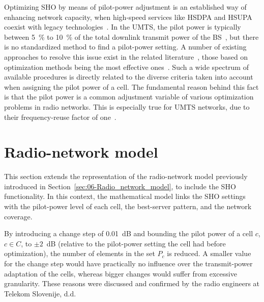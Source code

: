 Optimizing SHO by means of pilot-power adjustment is an established
way of enhancing network capacity, when high-speed services like HSDPA
and HSUPA coexist with legacy technologies~\cite{chen2008cpich}.
In the UMTS, the pilot power is typically between 5~\% to 10~\%
of the total downlink transmit power of the BS~\cite{RadioNetworkPlanningAndOptimisationForUMTS},
but there is no standardized method to fi{}nd a pilot-power setting.
A number of existing approaches to resolve this issue exist in the
related literature~\cite{WCDMAforUMTS_RadioAccessForThirdGenerationMobileCommunications,Siomina_PilotPowerManagementInWCDMANetworksCoverageControlWithRespectToTrafficDistribution,Ying_CPICHPowerSettingsInIrregularWCDMAMacroCellularNetworks},
those based on optimization methods being the most eff{}ective ones~\cite{Eisenblatter_OptimizationMethodsForUMTSRadioNetworkPlanning,GarciaLozano_CPICHPowerOptimisationByMeansOfSimulatedAnnealingInAnUTRAFDDEnvironment,RadioNetworkPlanningAndOptimisationForUMTS,UMTSRadioNetworkPlanning_OptimizationAndQoSManagementForPracticalEngineeringTasks,Siomina:Minimum.pilot.power.for.service.coverage}.
Such a wide spectrum of available procedures is directly related to
the diverse criteria taken into account when assigning the pilot power
of a cell. The fundamental reason behind this fact is that the pilot
power is a common adjustment variable of various optimization problems
in radio networks. This is especially true for UMTS networks, due
to their frequency-reuse factor of one~\cite{WCDMAforUMTS_RadioAccessForThirdGenerationMobileCommunications}.


\section{Radio-network model \label{sec:07-Radio_network_model}}

This section extends the representation of the radio-network model
previously introduced in Section~\ref{sec:06-Radio_network_model},
to include the SHO functionality. In this context, the mathematical
model links the SHO settings with the pilot-power level of each cell,
the best-server pattern, and the network coverage.

By introducing a change step of 0.01~dB and bounding the pilot power
of a cell $c$, $c\in C$, to $\pm2$~dB (relative to the pilot-power
setting the cell had before optimization), the number of elements
in the set $P_{c}$ is reduced. A smaller value for the change step
would have practically no influence over the transmit-power adaptation
of the cells, whereas bigger changes would suffer from excessive granularity.
These reasons were discussed and confirmed by the radio engineers
at Telekom Slovenije, d.d.

